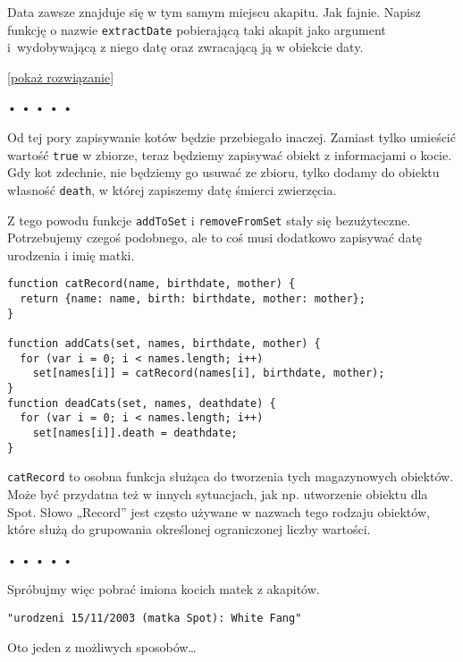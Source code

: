 Data zawsze znajduje się w tym samym miejscu akapitu. Jak fajnie. Napisz funkcję o nazwie \texttt{extractDate} pobierającą taki akapit jako argument i~wydobywającą z niego datę oraz zwracającą ją w obiekcie daty.

    
[\hyperref[sol:4.6]{pokaż rozwiązanie}]
    
    
  
  
\begin{center}
• • • • •
\end{center}
  
    
Od tej pory zapisywanie kotów będzie przebiegało inaczej. Zamiast tylko umieścić wartość \texttt{true} w zbiorze, teraz będziemy zapisywać obiekt z informacjami o kocie. Gdy kot zdechnie, nie będziemy go usuwać ze zbioru, tylko dodamy do obiektu własność \texttt{death}, w której zapiszemy datę śmierci zwierzęcia.

    
Z tego powodu funkcje \texttt{addToSet} i \texttt{removeFromSet} stały się bezużyteczne. Potrzebujemy czegoś podobnego, ale to coś musi dodatkowo zapisywać datę urodzenia i imię matki.

    
\begin{verbatim} 
function catRecord(name, birthdate, mother) {
  return {name: name, birth: birthdate, mother: mother};
}

function addCats(set, names, birthdate, mother) {
  for (var i = 0; i < names.length; i++)
    set[names[i]] = catRecord(names[i], birthdate, mother);
}
function deadCats(set, names, deathdate) {
  for (var i = 0; i < names.length; i++)
    set[names[i]].death = deathdate;
}
 \end{verbatim}
    
\texttt{catRecord} to osobna funkcja służąca do tworzenia tych magazynowych obiektów. Może być przydatna też w innych sytuacjach, jak np. utworzenie obiektu dla Spot. Słowo „Record” jest często używane w nazwach tego rodzaju obiektów, które służą do grupowania określonej ograniczonej liczby wartości.

  
  
\begin{center}
• • • • •
\end{center}
  
    
Spróbujmy więc pobrać imiona kocich matek z akapitów.

    
\begin{verbatim} 
"urodzeni 15/11/2003 (matka Spot): White Fang"
 \end{verbatim}
    
Oto jeden z możliwych sposobów…

